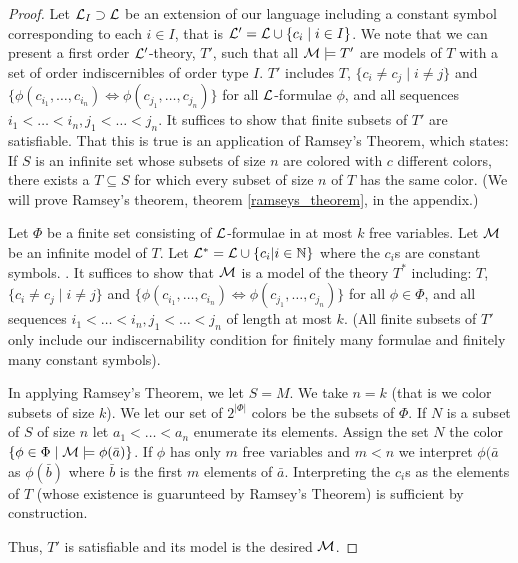 \begin{proof}
Let \(\mathcal{L}_I \supset \mathcal{L}\) be an extension of our language including a constant symbol corresponding to each \(i \in I\), that is \(\mathcal{L}' = \mathcal{L} \cup \{c_i \mid i \in I\}\).
We note that we can present a first order \(\mathcal{L}'\)-theory, \(T'\), such that all \(\mathcal{M} \models T'\) are models of \(T\) with a set of order indiscernibles of order type \(I\).
\(T'\) includes \(T\), \(\{c_i \neq c_j \mid i \neq j\}\) and \(\{\phi(c_{i_1}, \ldots, c_{i_n}) \iff \phi(c_{j_1}, \ldots, c_{j_n})\}\) for all \(\mathcal{L}\)-formulae \(\phi\), and all sequences \(i_1 < \ldots < i_n, j_1 < \ldots < j_n\). 
It suffices to show that finite subsets of \(T'\) are satisfiable. 
That this is true is an application of Ramsey's Theorem, which states: 
If \(S\) is an infinite set whose subsets of size \(n\) are colored with \(c\) different colors, there exists a \(T \subseteq S\) for which every subset of size \(n\) of \(T\) has the same color. 
(We will prove Ramsey's theorem, theorem \ref{ramseys_theorem}, in the appendix.)

Let \(\Phi\) be a finite set consisting of \(\mathcal{L}\)-formulae in at most \(k\) free variables. 
Let \(\mathcal{M}\) be an infinite model of \(T\). 
Let \(\mathcal{L}^* = \mathcal{L} \cup \{c_i | i \in \mathbb{N}\}\) where the \(c_i\)s are constant symbols. .
It suffices to show that \(\mathcal{M}\) is a model of the theory \(T^*\) including: \(T\), \(\{c_i \neq c_j \mid i \neq j\}\) and \(\{\phi(c_{i_1}, \ldots, c_{i_n}) \iff \phi(c_{j_1}, \ldots, c_{j_n})\}\) for all \(\phi \in \Phi\), and all sequences \(i_1 < \ldots < i_n, j_1 < \ldots < j_n\) of length at most \(k\). 
(All finite subsets of \(T'\) only include our indiscernability condition for finitely many formulae and finitely many constant symbols).

In applying Ramsey's Theorem, we let \(S = M\). 
We take \(n = k\) (that is we color subsets of size \(k\)).
We let our set of \(2^{|\Phi|}\) colors be the subsets of \(\Phi\). 
If \(N\) is a subset of \(S\) of size \(n\) let \(a_1 < \ldots < a_n\) enumerate its elements. 
Assign the set \(N\) the color \(\{\phi \in \Phi \mid \mathcal{M} \models \phi(\bar{a})\}\). 
If \(\phi\) has only \(m\) free variables and \(m < n\) we interpret \(\phi(\bar{a}\) as \(\phi(\bar{b})\) where \(\bar{b}\) is the first \(m\) elements of \(\bar{a}\).
Interpreting the \(c_i\)s as the elements of \(T\) (whose existence is guarunteed by Ramsey's Theorem) is sufficient by construction.

Thus, \(T'\) is satisfiable and its model is the desired \(\mathcal{M}\).
\end{proof}

